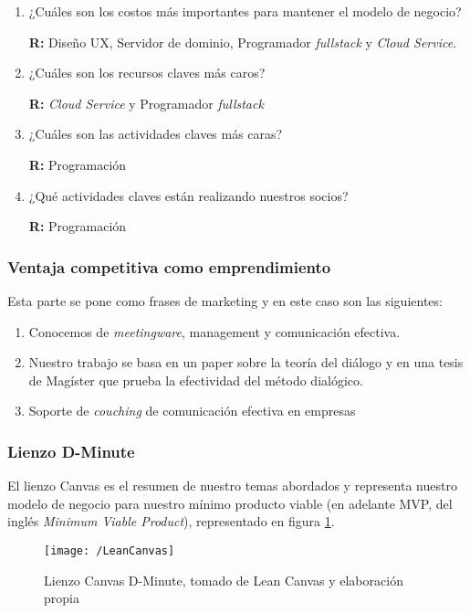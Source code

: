 \begin{enumerate}[1.]
	\item ¿Cuáles son los costos más importantes para mantener el modelo de negocio? 
	
	\textbf{R:} Diseño UX, Servidor de dominio, Programador \textit{fullstack} y \textit{Cloud Service}.
	\item ¿Cuáles son los recursos claves más caros? 
	
	\textbf{R:} \textit{Cloud Service} y Programador \textit{fullstack}
	\item ¿Cuáles son las actividades claves más caras? 

	\textbf{R:} Programación 

	\item ¿Qué actividades claves están realizando nuestros socios? 
	
	\textbf{R:} Programación
\end{enumerate}

\subsubsection{Ventaja competitiva como emprendimiento}

Esta parte se pone como frases de marketing y en este caso son las siguientes: 

\begin{enumerate}[1.]
	\item Conocemos de \textit{meetingware}, management y comunicación efectiva.
	\item Nuestro trabajo se basa en un paper sobre la teoría del diálogo y en una tesis de Magíster que prueba la efectividad del método dialógico.
	\item Soporte de \textit{couching} de comunicación efectiva en empresas
\end{enumerate}

\subsubsection{Lienzo D-Minute}

El lienzo Canvas es el resumen de nuestro temas abordados y representa nuestro modelo de negocio para nuestro mínimo producto viable (en adelante MVP, del inglés \textit{Minimum Viable Product}), representado en figura \ref{img3-1}.

\begin{figure}[h]
\centering
\texttt{[image: /LeanCanvas]}
\caption{Lienzo Canvas D-Minute, tomado de Lean Canvas y elaboración propia} 
\label{img3-1}
\end{figure}

